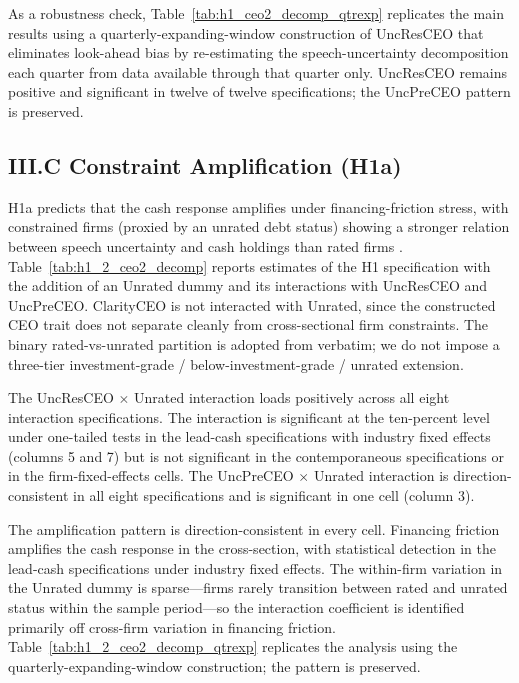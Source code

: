 As a robustness check, Table~\ref{tab:h1_ceo2_decomp_qtrexp} replicates the main results using a quarterly-expanding-window construction of UncResCEO that eliminates look-ahead bias by re-estimating the speech-uncertainty decomposition each quarter from data available through that quarter only. UncResCEO remains positive and significant in twelve of twelve specifications; the UncPreCEO pattern is preserved.

\subsection*{III.C Constraint Amplification (H1a)}
\label{sec:main:hfc}

H1a predicts that the cash response amplifies under financing-friction stress, with constrained firms (proxied by an unrated debt status) showing a stronger relation between speech uncertainty and cash holdings than rated firms \cite{almeida2004}. Table~\ref{tab:h1_2_ceo2_decomp} reports estimates of the H1 specification with the addition of an Unrated dummy and its interactions with UncResCEO and UncPreCEO. ClarityCEO is not interacted with Unrated, since the constructed CEO trait does not separate cleanly from cross-sectional firm constraints. The binary rated-vs-unrated partition is adopted from  verbatim; we do not impose a three-tier investment-grade / below-investment-grade / unrated extension.

The UncResCEO $\times$ Unrated interaction loads positively across all eight interaction specifications. The interaction is significant at the ten-percent level under one-tailed tests in the lead-cash specifications with industry fixed effects (columns 5 and 7) but is not significant in the contemporaneous specifications or in the firm-fixed-effects cells. The UncPreCEO $\times$ Unrated interaction is direction-consistent in all eight specifications and is significant in one cell (column 3).

The amplification pattern is direction-consistent in every cell. Financing friction amplifies the cash response in the cross-section, with statistical detection in the lead-cash specifications under industry fixed effects. The within-firm variation in the Unrated dummy is sparse---firms rarely transition between rated and unrated status within the sample period---so the interaction coefficient is identified primarily off cross-firm variation in financing friction. Table~\ref{tab:h1_2_ceo2_decomp_qtrexp} replicates the analysis using the quarterly-expanding-window construction; the pattern is preserved.

